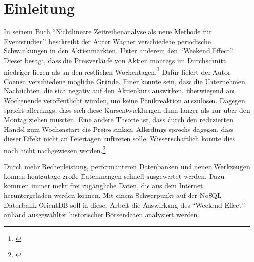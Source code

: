\section{Einleitung}


In seinem Buch \enquote{Nichtlineare Zeitreihenanalyse als neue Methode für Eventstudien} beschreibt der Autor Wagner verschiedene periodische Schwankungen in den Aktienmärkten. Unter anderem den \enquote{Weekend Effect}. Dieser besagt, dass die Preisverläufe von Aktien montags im Durchschnitt niedriger liegen als an den restlichen Wochentagen.\footnote{\cite[Vgl.][17]{Wagner2019}} Dafür liefert der Autor Coenen verschiedene mögliche Gründe. Einer könnte sein, dass die Unternehmen Nachrichten, die sich negativ auf den Aktienkurs auswirken, überwiegend am Wochenende veröffentlicht würden, um keine Panikreaktion auszulösen. Dagegen spricht allerdings, dass sich diese Kursentwicklungen dann länger als nur über den Montag ziehen müssten. Eine andere Theorie ist, dass durch den reduzierten Handel zum Wochenstart die Preise sinken. Allerdings spreche dagegen, dass dieser Effekt nicht an Feiertagen auftreten solle. Wissenschaftlich konnte dies noch nicht nachgewiesen werden.\footnote{\cite[Vgl.][8]{Coenen2020}}

Durch mehr Rechenleistung, performanteren Datenbanken und neuen Werkzeugen können heutzutage große Datenmengen schnell ausgewertet werden. Dazu kommen immer mehr frei zugängliche Daten, die aus dem Internet heruntergeladen werden können. Mit einem Schwerpunkt auf der NoSQL Datenbank OrientDB soll in dieser Arbeit die Auswirkung des \enquote{Weekend Effect} anhand ausgewählter historischer Börsendaten analysiert werden.

\clearpage